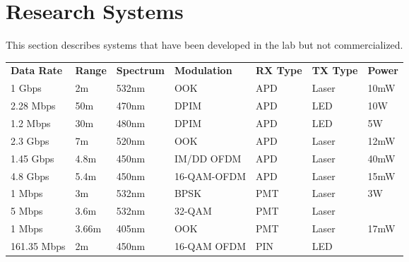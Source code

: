 \section{Research Systems}
This section describes systems that have been developed in the lab but not
commercialized.

\begin{table}[H]
\begin{tabular}{lllllll}
\textbf{Data Rate} & \textbf{Range} & \textbf{Spectrum} & \textbf{Modulation} &
\textbf{RX Type} & \textbf{TX Type} & \textbf{Power} \\
1 Gbps      & 2m     & 532nm & OOK         & APD & Laser & 10mW           \\
2.28 Mbps   & 50m    & 470nm & DPIM        & APD & LED   & 10W            \\
1.2 Mbps    & 30m    & 480nm & DPIM        & APD & LED   & 5W             \\
2.3 Gbps    & 7m     & 520nm & OOK         & APD & Laser & 12mW           \\
1.45 Gbps   & 4.8m   & 450nm & IM/DD OFDM  & APD & Laser & 40mW           \\
4.8 Gbps    & 5.4m   & 450nm & 16-QAM-OFDM & APD & Laser & 15mW           \\
1 Mbps      & 3m     & 532nm & BPSK        & PMT & Laser & 3W             \\
5 Mbps      & 3.6m   & 532nm & 32-QAM      & PMT & Laser &                \\
1 Mbps      & 3.66m  & 405nm & OOK         & PMT & Laser & 17mW           \\
161.35 Mbps & 2m     & 450nm & 16-QAM OFDM & PIN & LED   &
\end{tabular}
\end{table}
